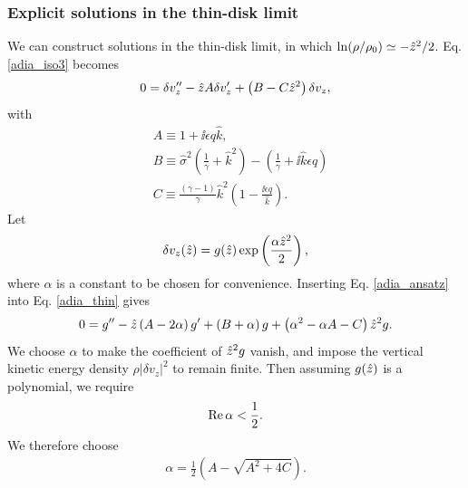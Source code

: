 \subsubsection{Explicit solutions in the thin-disk limit}
We can construct solutions in the thin-disk limit, in which 
$\ln(\rho/\rho_0) \simeq -\hat{z}^2/2$. Eq. \ref{adia_iso3} becomes   
\begin{align}
  0 = \delta v_z^{\prime\prime} - \hat{z} A \delta v_z^\prime + \left(B
    - C \hat{z}^2\right)\delta v_z,
\end{align}
with
\begin{align}
  &A \equiv 1 + \ii \epsilon q \hat{k},\\
  &B \equiv \hat{\sigma}^2\left(\frac{1}{\gamma} + \hat{k}^2\right) -
  \left(\frac{1}{\gamma} + \ii \hat{k} \epsilon q\right)\\
  &C \equiv \frac{\left(\gamma-1\right)}{\gamma}\hat{k}^2\left(1 - \frac{\ii
      \epsilon q}{\hat{k}}\right).\label{adia_thin}
\end{align}
Let
\begin{align}
  \delta v_z(\hat{z}) =
  g(\hat{z})\exp\left(\frac{\alpha\hat{z}^2}{2}\right), \label{adia_ansatz}
\end{align}
where $\alpha$ is a constant to be chosen for convenience. Inserting
Eq. \ref{adia_ansatz} into Eq. \ref{adia_thin} gives
\begin{align}
  0 = g^{\prime\prime} - \hat{z}\left(A - 2\alpha\right)g^\prime + \left(B +
    \alpha\right)g
  +\left(\alpha^2 - \alpha A - C\right)\hat{z}^2 g.
\end{align}
We choose $\alpha$ to make the coefficient of $\hat{z}^2g$
vanish, and impose the vertical kinetic energy density
$\rho|\delta v_z|^2$ to remain finite. Then assuming $g(\hat{z})$ is a
polynomial, we require  
\begin{align}
  \operatorname{Re}\alpha < \frac{1}{2}. 
\end{align}
We therefore choose 
\begin{align}
  \alpha = \frac{1}{2}\left(A - \sqrt{A^2 + 4C}\right). 
\end{align} 

